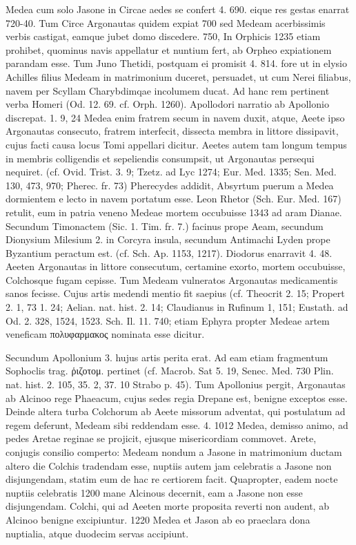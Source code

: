 \documentclass[a4paper, 11pt, oneside, polutonikogreek, german]{article}
\begin{document}
Medea cum solo Jasone in Circae aedes se confert 4. 690. eique res gestas enarrat 720-40. Tum Circe Argonautas quidem expiat 700 sed Medeam acerbissimis verbis castigat, eamque jubet domo discedere. 750, In Orphicis 1235 etiam prohibet, quominus navis appellatur et nuntium fert, ab Orpheo expiationem parandam esse. Tum Juno Thetidi, postquam ei promisit 4. 814. fore ut in elysio Achilles filius Medeam in matrimonium duceret, persuadet, ut cum Nerei filiabus, navem per Scyllam Charybdimqae incolumem ducat. Ad hanc rem pertinent verba Homeri (Od. 12. 69. cf. Orph. 1260). Apollodori narratio ab Apollonio discrepat. 1. 9, 24 Medea enim fratrem secum in navem duxit, atque, Aeete ipso Argonautas consecuto, fratrem interfecit, dissecta membra in littore dissipavit, cujus facti causa locus Tomi appellari dicitur. Aeetes autem tam longum tempus in membris colligendis et sepeliendis consumpsit, ut Argonautas persequi nequiret. (cf. Ovid. Trist. 3. 9; Tzetz. ad Lyc 1274; Eur. Med. 1335; Sen. Med. 130, 473, 970; Pherec. fr. 73) Pherecydes addidit, Absyrtum puerum a Medea dormientem e lecto in navem portatum esse. Leon Rhetor (Sch. Eur. Med. 167) retulit, eum in patria veneno Medeae mortem occubuisse 1343 ad aram Dianae. Secundum Timonactem (Sic. 1. Tim. fr. 7.) facinus prope Aeam, secundum Dionysium Milesium 2. in Corcyra insula, secundum Antimachi Lyden prope Byzantium peractum est. (cf. Sch. Ap. 1153, 1217). Diodorus enarravit 4. 48. Aeeten Argonautas in littore consecutum, certamine exorto, mortem occubuisse, Colchosque fugam cepisse. Tum Medeam vulneratos Argonautas medicamentis sanos fecisse. Cujus artis medendi mentio fit saepius (cf. Theocrit 2. 15; Propert 2. 1, 73 1. 24; Aelian. nat. hist. 2. 14; Claudianus in Rufinum 1, 151; Eustath. ad Od. 2. 328, 1524, 1523. Sch. Il. 11. 740; etiam Ephyra propter Medeae artem veneficam πολυφαρμακος nominata esse dicitur.

Secundum Apollonium 3. hujus artis perita erat. Ad eam etiam fragmentum Sophoclis trag. ῥιζοτομ. pertinet (cf. Macrob. Sat 5. 19, Senec. Med. 730 Plin. nat. hist. 2. 105, 35. 2, 37. 10 Strabo p. 45). Tum Apollonius pergit, Argonautas ab Alcinoo rege Phaeacum, cujus sedes regia Drepane est, benigne exceptos esse. Deinde altera turba Colchorum ab Aeete missorum adventat, qui postulatum ad regem deferunt, Medeam sibi reddendam esse. 4. 1012 Medea, demisso animo, ad pedes Aretae reginae se projicit, ejusque misericordiam commovet. Arete, conjugis consilio comperto: Medeam nondum a Jasone in matrimonium ductam altero die Colchis tradendam esse, nuptiis autem jam celebratis a Jasone non disjungendam, statim eum de hac re certiorem facit. Quapropter, eadem nocte nuptiis celebratis 1200 mane Alcinous decernit, eam a Jasone non esse disjungendam. Colchi, qui ad Aeeten morte proposita reverti non audent, ab Alcinoo benigne excipiuntur. 1220 Medea et Jason ab eo praeclara dona nuptialia, atque duodecim servas accipiunt.
\end{document}
